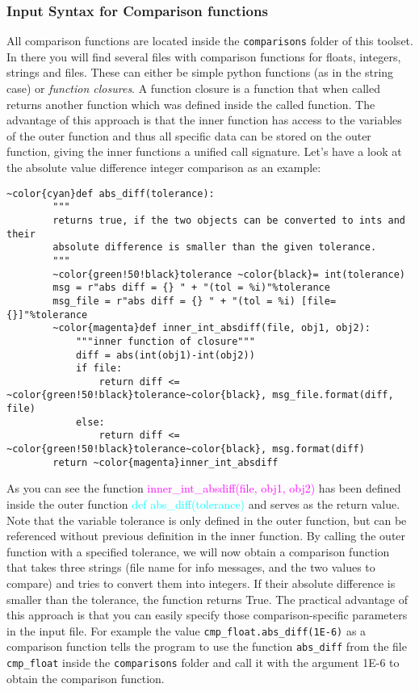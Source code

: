 \documentclass[a4paper,12pt]{scrartcl}
\begin{document}
\subsubsection*{Input Syntax for Comparison functions}\label{closures}
All comparison functions are located inside the \texttt{comparisons} folder of this toolset. In there you will find
several files with comparison functions for floats, integers, strings and files. These can either be simple python
functions (as in the string case) or \textit{function closures}. A function closure is a function that when called
returns another function which was defined inside the called function. The advantage of this approach is that the
inner function has access to the variables of the outer function and thus all specific data can be stored on the
outer function, giving the inner functions a unified call signature. Let's have a look at the absolute value
difference integer comparison as an example:
\begin{Verbatim}[commandchars=~\{\},gobble=4, frame=single, framesep=2mm, label=cmp\_int.abs\_diff,
labelposition=bottomline]
    ~color{cyan}def abs_diff(tolerance):
        """
        returns true, if the two objects can be converted to ints and their
        absolute difference is smaller than the given tolerance.
        """
        ~color{green!50!black}tolerance ~color{black}= int(tolerance)
        msg = r"abs diff = {} " + "(tol = %i)"%tolerance
        msg_file = r"abs diff = {} " + "(tol = %i) [file={}]"%tolerance
        ~color{magenta}def inner_int_absdiff(file, obj1, obj2):
            """inner function of closure"""
            diff = abs(int(obj1)-int(obj2))
            if file:
                return diff <= ~color{green!50!black}tolerance~color{black}, msg_file.format(diff, file)
            else:
                return diff <= ~color{green!50!black}tolerance~color{black}, msg.format(diff)
        return ~color{magenta}inner_int_absdiff
\end{Verbatim}
As you can see the function \textcolor{magenta}{inner\_int\_absdiff(file, obj1, obj2)} has been defined inside the
outer function \textcolor{cyan}{def abs\_diff(tolerance)} and serves as the return value. Note that the variable
\textcolor{green!50!black}{tolerance} is only defined in the outer function, but can be referenced without previous
definition in the inner function. By calling the outer function with a specified tolerance, we will now obtain a
comparison function that takes three strings (file name for info messages, and the two values to compare) and tries
to convert them into integers. If their absolute difference is smaller than the tolerance, the function returns True.
The practical advantage of this approach is that you can easily specify those comparison-specific parameters in the
input file. For example the value \texttt{cmp\_float.abs\_diff(1E-6)} as a comparison function tells the program to
use the function \texttt{abs\_diff} from the file \texttt{cmp\_float} inside the \texttt{comparisons} folder and call
it with the argument 1E-6 to obtain the comparison function.
\end{document}
